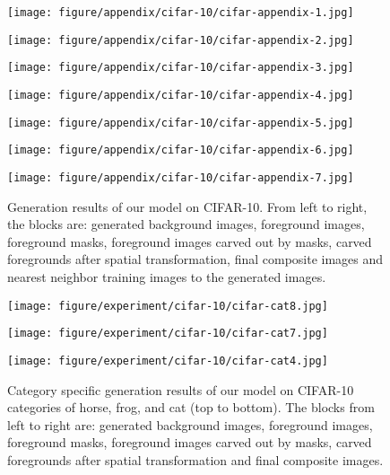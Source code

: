 \documentclass{article} \usepackage{iclr2017_conference,times}
\begin{document}
\begin{figure}[t]
\begin{minipage}{0.138\linewidth}
\center
\texttt{[image: figure/appendix/cifar-10/cifar-appendix-1.jpg]}
\end{minipage}
\begin{minipage}{0.138\linewidth}
\center
\texttt{[image: figure/appendix/cifar-10/cifar-appendix-2.jpg]}
\end{minipage}
\begin{minipage}{0.138\linewidth}
\center
\texttt{[image: figure/appendix/cifar-10/cifar-appendix-3.jpg]}
\end{minipage}
\begin{minipage}{0.138\linewidth}
\center
\texttt{[image: figure/appendix/cifar-10/cifar-appendix-4.jpg]}
\end{minipage}
\begin{minipage}{0.138\linewidth}
\center
\texttt{[image: figure/appendix/cifar-10/cifar-appendix-5.jpg]}
\end{minipage}
\begin{minipage}{0.138\linewidth}
\center
\texttt{[image: figure/appendix/cifar-10/cifar-appendix-6.jpg]}
\end{minipage}
\begin{minipage}{0.138\linewidth}
\center
\texttt{[image: figure/appendix/cifar-10/cifar-appendix-7.jpg]}
\end{minipage}
\caption{Generation results of our model on CIFAR-10. From left to right, the blocks are: generated background images, foreground images, foreground masks, foreground images carved out by masks, carved foregrounds after spatial transformation, final composite images and nearest neighbor training images to the generated images.}
\label{Fig_CIFAROutputs_More}
\end{figure} 

\begin{figure}[h]
\begin{minipage}{1\linewidth}
\center
\texttt{[image: figure/experiment/cifar-10/cifar-cat8.jpg]}
\end{minipage}
\begin{minipage}{1\linewidth}
\center
\texttt{[image: figure/experiment/cifar-10/cifar-cat7.jpg]}
\end{minipage}
\begin{minipage}{1\linewidth}
\center
\texttt{[image: figure/experiment/cifar-10/cifar-cat4.jpg]}
\end{minipage}
\caption{Category specific generation results of our model on CIFAR-10 categories of horse, frog, and cat (top to bottom). The blocks from left to right are: generated background images, foreground images, foreground masks, foreground images carved out by masks, carved foregrounds after spatial transformation and final composite images.}
\label{Fig_CIFAROutputs_cat_fulll}
\end{figure}
\end{document}
